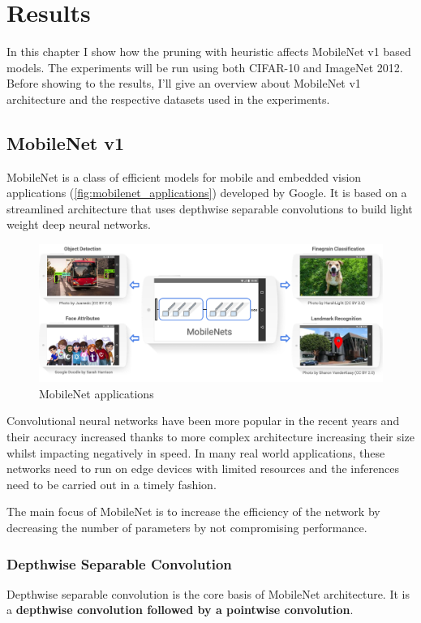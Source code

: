 \chapter{Results}\label{ch:results}
In this chapter I show how the pruning with heuristic affects MobileNet
v1\cite{howard2017mobilenets} based models. The experiments will be run using
both CIFAR-10\cite{cifar_10} and ImageNet 2012\cite{imagenet_cvpr09}.
Before showing to the results, I'll give an overview about MobileNet v1
architecture and the respective datasets used in the experiments.

\section{MobileNet v1}
MobileNet is a class of efficient models for mobile and embedded vision
applications (\autoref{fig:mobilenet_applications}) developed by Google.
It is based on a streamlined architecture that uses depthwise separable
convolutions to build light weight deep neural networks.

\begin{figure}[ht]
    \includegraphics[width=\textwidth]{images/results/mobilenet_applications.png}
    \centering
    \caption{MobileNet applications}\label{fig:mobilenet_applications}
\end{figure}

Convolutional neural networks have been more popular in the recent years and
their accuracy increased thanks to more complex architecture increasing their
size whilst impacting negatively in speed. In many real world applications,
these networks need to run on edge devices with limited resources and the
inferences need to be carried out in a timely fashion.

The main focus of MobileNet is to increase the efficiency of the network by
decreasing the number of parameters by not compromising
performance\cite{review_mobilenet}.

\subsection{Depthwise Separable Convolution}
Depthwise separable convolution is the core basis of MobileNet architecture. It
is a \textbf{depthwise convolution followed by a pointwise convolution}.

